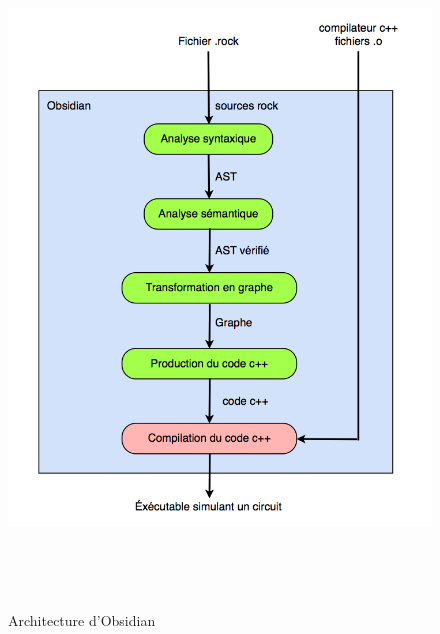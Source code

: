 \documentclass[13pt]{article}
\begin{document}
\begin{figure}
  \begin{center}
    \includegraphics[width=14.7cm,height=17.96cm]{obsidian.png}
    \caption{Architecture d'Obsidian}
    \label{Architecture d'Obsidian}
  \end{center}
\end{figure}
\end{document}

